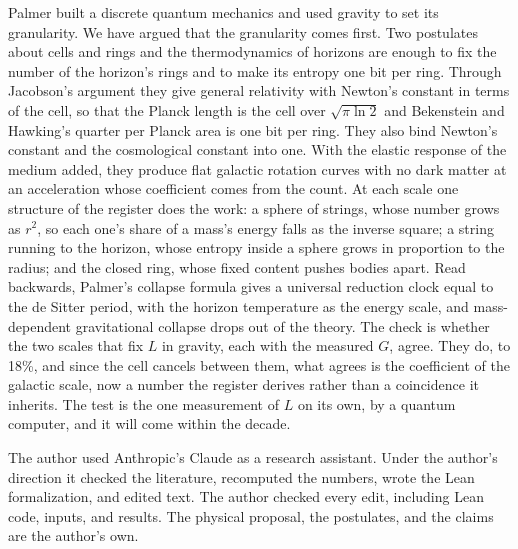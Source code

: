 \documentclass[aps,prd,twocolumn,superscriptaddress,nofootinbib,showkeys]{revtex4-2}
\makeatletter
\def\section{\@startsection{section}{1}{\z@}{0.6cm \@plus1ex \@minus .2ex}{0.35cm}{\normalfont\small\bfseries}}
\makeatother
\begin{document}
\begin{enumerate}
\end{enumerate}

\section{Conclusion}

Palmer built a discrete quantum mechanics and used gravity to set its granularity. We have argued that the granularity comes first. Two postulates about cells and rings and the thermodynamics of horizons are enough to fix the number of the horizon's rings and to make its entropy one bit per ring. Through Jacobson's argument they give general relativity with Newton's constant in terms of the cell, so that the Planck length is the cell over $\sqrt{\pi\ln2}$ and Bekenstein and Hawking's quarter per Planck area is one bit per ring. They also bind Newton's constant and the cosmological constant into one. With the elastic response of the medium added, they produce flat galactic rotation curves with no dark matter at an acceleration whose coefficient comes from the count. At each scale one structure of the register does the work: a sphere of strings, whose number grows as $r^2$, so each one's share of a mass's energy falls as the inverse square; a string running to the horizon, whose entropy inside a sphere grows in proportion to the radius; and the closed ring, whose fixed content pushes bodies apart. Read backwards, Palmer's collapse formula gives a universal reduction clock equal to the de Sitter period, with the horizon temperature as the energy scale, and mass-dependent gravitational collapse drops out of the theory. The check is whether the two scales that fix $L$ in gravity, each with the measured $G$, agree. They do, to 18\%, and since the cell cancels between them, what agrees is the coefficient of the galactic scale, now a number the register derives rather than a coincidence it inherits. The test is the one measurement of $L$ on its own, by a quantum computer, and it will come within the decade.

\begin{acknowledgments}
The author used Anthropic's Claude as a research assistant. Under the author's direction it checked the literature, recomputed the numbers, wrote the Lean formalization, and edited text. The author checked every edit, including Lean code, inputs, and results. The physical proposal, the postulates, and the claims are the author's own.
\end{acknowledgments}
\end{document}
